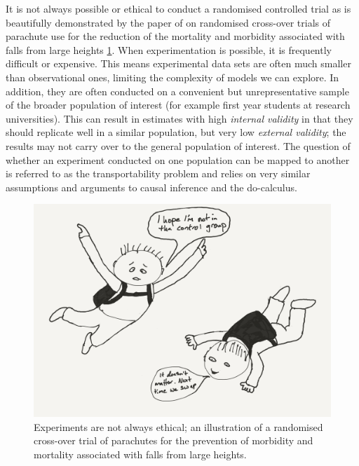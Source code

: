 \documentclass[11pt,a4paper,oneside]{book}
\theoremstyle{plain}
\theoremstyle{definition}
\begin{document}
It is not always possible or ethical to conduct a randomised controlled trial as is beautifully demonstrated by the paper of \citet{smith2003parachute} on randomised cross-over trials of parachute use for the reduction of the mortality and morbidity associated with falls from large heights \ref{fig:parashute}. When experimentation is possible, it is frequently difficult or expensive. This means experimental data sets are often much smaller than observational ones, limiting the complexity of models we can explore. In addition, they are often conducted on a convenient but unrepresentative sample of the broader population of interest (for example first year students at research universities). This can result in estimates with high \emph{internal validity} \citep{Campbell1963} in that they should replicate well in a similar population, but very low \emph{external validity}; the results may not carry over to the general population of interest. The question of whether an experiment conducted on one population can be mapped to another is referred to as the transportability problem \citep{Bareinboim2013} and relies on very similar assumptions and arguments to causal inference and the do-calculus. 

\begin{figure}
\begin{center}
\includegraphics[scale=.4]{double_blind_parashute_trial_cartoon.png}
\end{center}
\caption{Experiments are not always ethical; an illustration of a randomised cross-over trial of parachutes for the prevention of morbidity and mortality associated with falls from large heights.}
\label{fig:parashute}
\end{figure}
\end{document}
